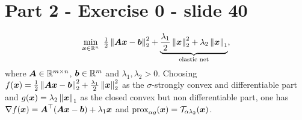 \section{Part 2 - Exercise 0 - slide 40}
%
\begin{equation*}
    \min_{\boldsymbol x \in \mathbb{R}^n}~{\textstyle\frac{1}{2}} \left\lVert\boldsymbol{Ax}-\boldsymbol b\right\rVert_{2}^2
    + \underbrace{\frac{\lambda_1}{2} \left\lVert\boldsymbol x\right\rVert_{2}^2 
    + \lambda_2 \left\lVert\boldsymbol x\right\rVert_{1}}_{\text{elastic net}},
\end{equation*}
%
where $\boldsymbol A \in \mathbb{R}^{m\times n}$, $\boldsymbol b \in \mathbb{R}^m$ and 
$\lambda_1, \lambda_2>0$.
%
Choosing $f(\boldsymbol x) = {\textstyle\frac{1}{2}} \left\lVert\boldsymbol{Ax}-\boldsymbol b\right\rVert_{2}^2 
+ \frac{\lambda_1}{2} \left\lVert\boldsymbol x\right\rVert_{2}^2$ as the $\sigma$-strongly 
convex and differentiable part and 
$g(\boldsymbol x) = \lambda_2 \left\lVert\boldsymbol x\right\rVert_{1}$ as the closed 
convex but non differentiable part, one has 
$\nabla f(\boldsymbol x) = \boldsymbol A^\top (\boldsymbol{Ax}-\boldsymbol b) + \lambda_1 
\boldsymbol{x}$ and $\operatorname{prox}_{\alpha g}(\boldsymbol x) = 
\mathcal T_{\alpha\lambda_2}(\boldsymbol x)$.
%
